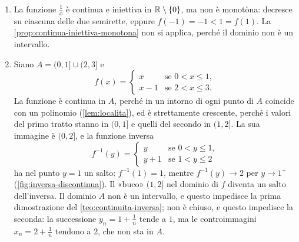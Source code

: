 \begin{esempio}\label{es:inversa-discontinua}
\begin{enumerate}[label=\textup{(\roman*)}]
  \item La funzione $\frac1x$ è continua e iniettiva in $\mathbb{R}\setminus\{0\}$, ma non è
  monotòna: decresce su ciascuna delle due semirette, eppure $f(-1)=-1<1=f(1)$. La
  \cref{prop:continua-iniettiva-monotona} non si applica, perché il dominio non è un
  intervallo.
  \item Siano $A=(0,1]\cup(2,3]$ e
  \[
    f(x)=
    \begin{cases}
      x & \text{se } 0<x\le1,\\
      x-1 & \text{se } 2<x\le3 .
    \end{cases}
  \]
  La funzione è continua in $A$, perché in un intorno di ogni punto di $A$ coincide con
  un polinomio (\cref{lem:localita}), ed è strettamente crescente, perché i valori del
  primo tratto stanno in $(0,1]$ e quelli del secondo in $(1,2]$. La sua immagine è
  $(0,2]$, e la funzione inversa
  \[
    f^{-1}(y)=
    \begin{cases}
      y & \text{se } 0<y\le1,\\
      y+1 & \text{se } 1<y\le2
    \end{cases}
  \]
  ha nel punto $y=1$ un salto: $f^{-1}(1)=1$, mentre $f^{-1}(y)\to2$ per $y\to1^{+}$
  (\cref{fig:inversa-discontinua}). Il «buco» $(1,2]$ nel dominio di $f$ diventa un
  salto dell'inversa. Il dominio $A$ non è un intervallo, e questo impedisce la prima
  dimostrazione del \cref{teo:continuita-inversa}; non è chiuso, e questo impedisce la
  seconda: la successione $y_{n}=1+\frac1n$ tende a $1$, ma le controimmagini
  $x_{n}=2+\frac1n$ tendono a $2$, che non sta in $A$.
\end{enumerate}
\end{esempio}


